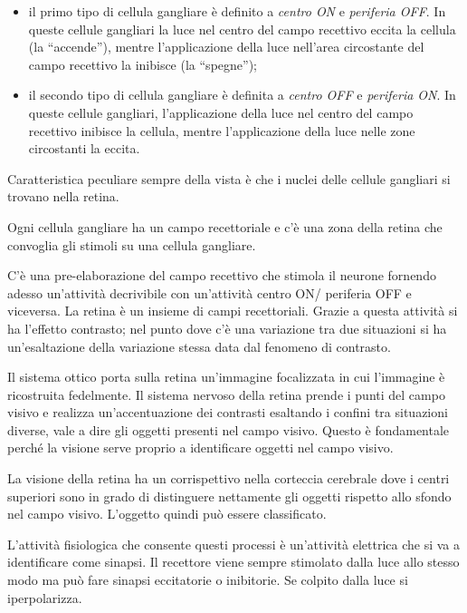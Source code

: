 \documentclass[]{article}
\begin{document}
\begin{itemize}
\itemsep1pt\parskip0pt
\item
  il primo tipo di cellula gangliare è definito a \emph{centro ON} e
  \emph{periferia OFF}. In queste cellule gangliari la luce nel centro
  del campo recettivo eccita la cellula (la ``accende''), mentre
  l'applicazione della luce nell'area circostante del campo recettivo la
  inibisce (la ``spegne'');
\item
  il secondo tipo di cellula gangliare è definita a \emph{centro OFF} e
  \emph{periferia ON}. In queste cellule gangliari, l'applicazione della
  luce nel centro del campo recettivo inibisce la cellula, mentre
  l'applicazione della luce nelle zone circostanti la eccita.
\end{itemize}

Caratteristica peculiare sempre della vista è che i nuclei delle cellule
gangliari si trovano nella retina.

Ogni cellula gangliare ha un campo recettoriale e c'è una zona della
retina che convoglia gli stimoli su una cellula gangliare.

C'è una pre-elaborazione del campo recettivo che stimola il neurone
fornendo adesso un'attività decrivibile con un'attività centro ON/
periferia OFF e viceversa. La retina è un insieme di campi recettoriali.
Grazie a questa attività si ha l'effetto contrasto; nel punto dove c'è
una variazione tra due situazioni si ha un'esaltazione della variazione
stessa data dal fenomeno di contrasto.

Il sistema ottico porta sulla retina un'immagine focalizzata in cui
l'immagine è ricostruita fedelmente. Il sistema nervoso della retina
prende i punti del campo visivo e realizza un'accentuazione dei
contrasti esaltando i confini tra situazioni diverse, vale a dire gli
oggetti presenti nel campo visivo. Questo è fondamentale perché la
visione serve proprio a identificare oggetti nel campo visivo.

La visione della retina ha un corrispettivo nella corteccia cerebrale
dove i centri superiori sono in grado di distinguere nettamente gli
oggetti rispetto allo sfondo nel campo visivo. L'oggetto quindi può
essere classificato.

L'attività fisiologica che consente questi processi è un'attività
elettrica che si va a identificare come sinapsi. Il recettore viene
sempre stimolato dalla luce allo stesso modo ma può fare sinapsi
eccitatorie o inibitorie. Se colpito dalla luce si iperpolarizza.
\end{document}
